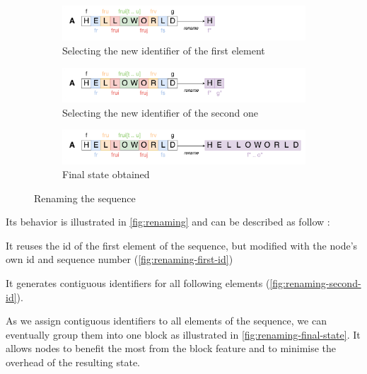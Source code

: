 \documentclass[sigplan,10pt]{acmart}
\begin{document}
\begin{figure}
    \begin{subfigure}{\columnwidth}
        \centering
        \includegraphics[width=0.9\columnwidth]{img/renaming-first-id.png}
        \caption{Selecting the new identifier of the first element}
        \label{fig:renaming-first-id}
    \end{subfigure}
    \begin{subfigure}{\columnwidth}
        \centering
        \includegraphics[width=0.9\columnwidth]{img/renaming-second-id.png}
        \caption{Selecting the new identifier of the second one}
        \label{fig:renaming-second-id}
    \end{subfigure}
    \begin{subfigure}{\columnwidth}
        \centering
        \includegraphics[width=0.9\columnwidth]{img/renaming-final-state.png}
        \caption{Final state obtained}
        \label{fig:renaming-final-state}
    \end{subfigure}
    \caption{Renaming the sequence}
    \label{fig:renaming}
\end{figure}

Its behavior is illustrated in \autoref{fig:renaming} and can be described as follow :
\begin{enumerate*}
    \item It reuses the id of the first element of the sequence, but modified with the node's own id and sequence number (\autoref{fig:renaming-first-id})
    \item It generates contiguous identifiers for all following elements (\autoref{fig:renaming-second-id}).
\end{enumerate*}
As we assign contiguous identifiers to all elements of the sequence, we can eventually group them into one block as illustrated in \autoref{fig:renaming-final-state}.
It allows nodes to benefit the most from the block feature and to minimise the overhead of the resulting state.
\end{document}
